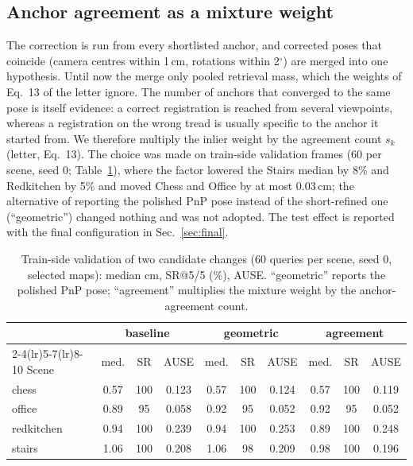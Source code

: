 \documentclass[journal]{IEEEtran}
\begin{document}
\subsection{Anchor agreement as a mixture weight}
\label{sec:support}
The correction is run from every shortlisted anchor, and corrected poses
that coincide (camera centres within 1\,cm, rotations within 2$^\circ$) are
merged into one hypothesis. Until now the merge only pooled retrieval mass,
which the weights of Eq.~13 of the letter ignore. The number of anchors that
converged to the same pose is itself evidence: a correct registration is
reached from several viewpoints, whereas a registration on the wrong tread
is usually specific to the anchor it started from. We therefore multiply the
inlier weight by the agreement count $s_k$ (letter, Eq.~13). The choice was
made on train-side validation frames (60 per scene, seed 0;
Table~\ref{tab:support-val}), where the factor lowered the Stairs median by 8\% and Redkitchen by 5\% and
moved Chess and Office by at most 0.03\,cm; the alternative of reporting the polished PnP pose
instead of the short-refined one (``geometric'') changed nothing and was not
adopted. The test effect is reported with the final configuration in
Sec.~\ref{sec:final}.

\begin{table}[h]
\caption{Train-side validation of two candidate changes (60 queries per
scene, seed 0, selected maps): median cm, SR@5/5 (\%), AUSE. ``geometric''
reports the polished PnP pose; ``agreement'' multiplies the mixture weight by
the anchor-agreement count.}
\label{tab:support-val}
\centering\footnotesize
\setlength{\tabcolsep}{3pt}
\begin{tabular}{@{}l ccc ccc ccc@{}}
\toprule
& \multicolumn{3}{c}{baseline} & \multicolumn{3}{c}{geometric} & \multicolumn{3}{c}{agreement} \\
\cmidrule(lr){2-4}\cmidrule(lr){5-7}\cmidrule(lr){8-10}
Scene & med. & SR & AUSE & med. & SR & AUSE & med. & SR & AUSE \\
\midrule
chess & 0.57 & 100 & 0.123 & 0.57 & 100 & 0.124 & 0.57 & 100 & 0.119 \\
office & 0.89 & 95 & 0.058 & 0.92 & 95 & 0.052 & 0.92 & 95 & 0.052 \\
redkitchen & 0.94 & 100 & 0.239 & 0.94 & 100 & 0.253 & 0.89 & 100 & 0.248 \\
stairs & 1.06 & 100 & 0.208 & 1.06 & 98 & 0.209 & 0.98 & 100 & 0.196 \\
\bottomrule
\end{tabular}
\end{table}
\end{document}
